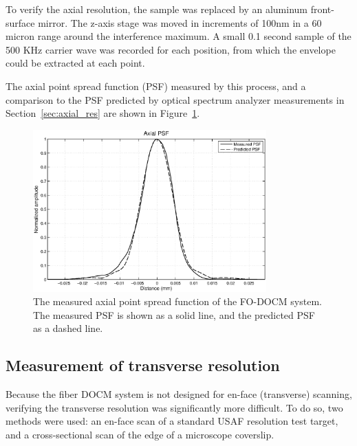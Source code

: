 
To verify the axial resolution, the sample was replaced by an aluminum front-surface mirror. The z-axis stage was moved in increments of 100nm in a 60 micron range around the interference maximum. A small 0.1 second sample of the 500 KHz carrier wave was recorded for each position, from which the envelope could be extracted at each point.

The axial point spread function (PSF) measured by this process, and a comparison to the PSF predicted by optical spectrum analyzer measurements in Section~\ref{sec:axial_res} are shown in Figure~\ref{fig:psf_comparison}.

\begin{figure}[h!]
\centering
\includegraphics[width=0.8\textwidth]{Images/Results/psf-aom2.eps}
\caption[The measured axial point spread function.]{The measured axial point spread function of the FO-DOCM system. The measured PSF is shown as a solid line, and the predicted PSF as a dashed line.\label{fig:psf_comparison}}
\end{figure}

\subsection{Measurement of transverse resolution}

Because the fiber DOCM system is not designed for en-face (transverse) scanning, verifying the transverse resolution was significantly more difficult. To do so, two methods were used: an en-face scan of a standard USAF resolution test target, and a cross-sectional scan of the edge of a microscope coverslip.

